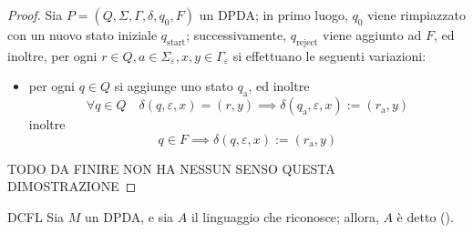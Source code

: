 \documentclass[a4paper, 12pt]{report}
\begin{document}
    \begin{proof}
        Sia $P = (Q, \Sigma, \Gamma, \delta, q_0, F)$ un DPDA; in primo luogo, $q_0$ viene rimpiazzato con un nuovo stato iniziale $q_{\mathrm{start}}$; successivamente, $q_{\mathrm{reject}}$ viene aggiunto ad $F$, ed inoltre, per ogni $r \in Q, a \in \Sigma_\varepsilon, x, y \in \Gamma_\varepsilon$ si effettuano le seguenti variazioni:

        \begin{itemize}
            \item per ogni $q \in Q$ si aggiunge uno stato $q_\mathrm{a}$, ed inoltre $$\forall q \in Q \quad \delta(q, \varepsilon, x) = (r, y) \implies \delta(q_\mathrm{a}, \varepsilon, x) := (r_\mathrm{a}, y)$$ inoltre $$q \in F \implies \delta(q, \varepsilon, x) := (r_\mathrm{a}, y)$$
        \end{itemize}

        TODO DA FINIRE NON HA NESSUN SENSO QUESTA DIMOSTRAZIONE
    \end{proof}

    \begin{frameddefn}{DCFL}
        Sia $M$ un DPDA, e sia $A$ il linguaggio che riconosce; allora, $A$ è detto  ().
    \end{frameddefn}
\end{document}
